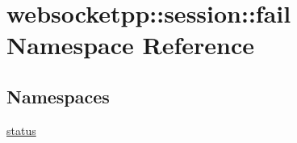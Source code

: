 \hypertarget{namespacewebsocketpp_1_1session_1_1fail}{}\section{websocketpp\+:\+:session\+:\+:fail Namespace Reference}
\label{namespacewebsocketpp_1_1session_1_1fail}
\subsection*{Namespaces}
\begin{DoxyCompactItemize}
\item 
 \hyperlink{namespacewebsocketpp_1_1session_1_1fail_1_1status}{status}
\end{DoxyCompactItemize}

